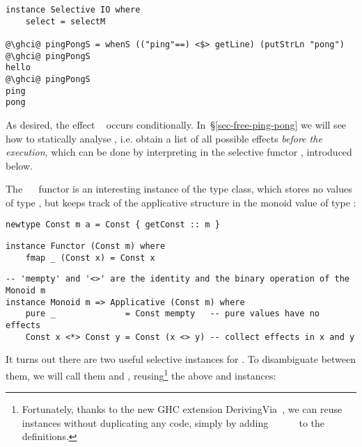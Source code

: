 {\vspace{1mm}
\begin{verbatim}
instance Selective IO where
    select = selectM

@\ghci@ pingPongS = whenS (("ping"==) <$> getLine) (putStrLn "pong")
@\ghci@ pingPongS
hello
@\ghci@ pingPongS
ping
pong
\end{verbatim}
\vspace{1mm}

\noindent
As desired, the effect ~ occurs conditionally.
In~\S\ref{sec-free-ping-pong} we will see how to statically analyse
, i.e. obtain a list of all possible effects \emph{before the
execution}, which can be done by interpreting  in the selective
functor , introduced below.

The ~~ functor is an interesting instance of the
 type class, which stores no values of type , but keeps
track of the applicative structure in the monoid value of type :

\vspace{1mm}
\begin{verbatim}
newtype Const m a = Const { getConst :: m }
\end{verbatim}
\vspace{1mm}
\begin{verbatim}
instance Functor (Const m) where
    fmap _ (Const x) = Const x
\end{verbatim}
\vspace{1mm}
\begin{verbatim}
-- 'mempty' and '<>' are the identity and the binary operation of the Monoid m
instance Monoid m => Applicative (Const m) where
    pure _              = Const mempty   -- pure values have no effects
    Const x <*> Const y = Const (x <> y) -- collect effects in x and y
\end{verbatim}
\vspace{1mm}

\noindent
It turns out there are two useful selective instances for . To
disambiguate between them, we will call them  and ,
reusing\footnote{Fortunately, thanks to the new GHC extension
\textsf{DerivingVia}~\citep{blondal2018deriving}, we can reuse 
instances without duplicating any code, simply by adding
~~~~~ to
the  definitions.}
the above  and  instances:

}
